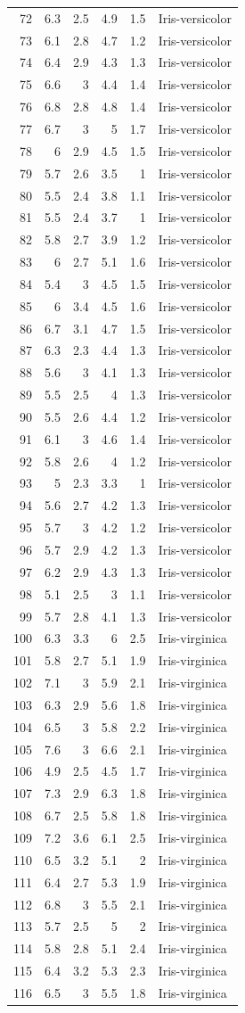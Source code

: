\documentclass [oneside,10pt,a4paper,ngerman,BCOR10mm,headsepline,parindent,final]{scrartcl}
\begin{document}
\begin{longtable}[]{@{}rrrrrl@{}}
72 & 6.3 & 2.5 & 4.9 & 1.5 & Iris-versicolor\tabularnewline
73 & 6.1 & 2.8 & 4.7 & 1.2 & Iris-versicolor\tabularnewline
74 & 6.4 & 2.9 & 4.3 & 1.3 & Iris-versicolor\tabularnewline
75 & 6.6 & 3 & 4.4 & 1.4 & Iris-versicolor\tabularnewline
76 & 6.8 & 2.8 & 4.8 & 1.4 & Iris-versicolor\tabularnewline
77 & 6.7 & 3 & 5 & 1.7 & Iris-versicolor\tabularnewline
78 & 6 & 2.9 & 4.5 & 1.5 & Iris-versicolor\tabularnewline
79 & 5.7 & 2.6 & 3.5 & 1 & Iris-versicolor\tabularnewline
80 & 5.5 & 2.4 & 3.8 & 1.1 & Iris-versicolor\tabularnewline
81 & 5.5 & 2.4 & 3.7 & 1 & Iris-versicolor\tabularnewline
82 & 5.8 & 2.7 & 3.9 & 1.2 & Iris-versicolor\tabularnewline
83 & 6 & 2.7 & 5.1 & 1.6 & Iris-versicolor\tabularnewline
84 & 5.4 & 3 & 4.5 & 1.5 & Iris-versicolor\tabularnewline
85 & 6 & 3.4 & 4.5 & 1.6 & Iris-versicolor\tabularnewline
86 & 6.7 & 3.1 & 4.7 & 1.5 & Iris-versicolor\tabularnewline
87 & 6.3 & 2.3 & 4.4 & 1.3 & Iris-versicolor\tabularnewline
88 & 5.6 & 3 & 4.1 & 1.3 & Iris-versicolor\tabularnewline
89 & 5.5 & 2.5 & 4 & 1.3 & Iris-versicolor\tabularnewline
90 & 5.5 & 2.6 & 4.4 & 1.2 & Iris-versicolor\tabularnewline
91 & 6.1 & 3 & 4.6 & 1.4 & Iris-versicolor\tabularnewline
92 & 5.8 & 2.6 & 4 & 1.2 & Iris-versicolor\tabularnewline
93 & 5 & 2.3 & 3.3 & 1 & Iris-versicolor\tabularnewline
94 & 5.6 & 2.7 & 4.2 & 1.3 & Iris-versicolor\tabularnewline
95 & 5.7 & 3 & 4.2 & 1.2 & Iris-versicolor\tabularnewline
96 & 5.7 & 2.9 & 4.2 & 1.3 & Iris-versicolor\tabularnewline
97 & 6.2 & 2.9 & 4.3 & 1.3 & Iris-versicolor\tabularnewline
98 & 5.1 & 2.5 & 3 & 1.1 & Iris-versicolor\tabularnewline
99 & 5.7 & 2.8 & 4.1 & 1.3 & Iris-versicolor\tabularnewline
100 & 6.3 & 3.3 & 6 & 2.5 & Iris-virginica\tabularnewline
101 & 5.8 & 2.7 & 5.1 & 1.9 & Iris-virginica\tabularnewline
102 & 7.1 & 3 & 5.9 & 2.1 & Iris-virginica\tabularnewline
103 & 6.3 & 2.9 & 5.6 & 1.8 & Iris-virginica\tabularnewline
104 & 6.5 & 3 & 5.8 & 2.2 & Iris-virginica\tabularnewline
105 & 7.6 & 3 & 6.6 & 2.1 & Iris-virginica\tabularnewline
106 & 4.9 & 2.5 & 4.5 & 1.7 & Iris-virginica\tabularnewline
107 & 7.3 & 2.9 & 6.3 & 1.8 & Iris-virginica\tabularnewline
108 & 6.7 & 2.5 & 5.8 & 1.8 & Iris-virginica\tabularnewline
109 & 7.2 & 3.6 & 6.1 & 2.5 & Iris-virginica\tabularnewline
110 & 6.5 & 3.2 & 5.1 & 2 & Iris-virginica\tabularnewline
111 & 6.4 & 2.7 & 5.3 & 1.9 & Iris-virginica\tabularnewline
112 & 6.8 & 3 & 5.5 & 2.1 & Iris-virginica\tabularnewline
113 & 5.7 & 2.5 & 5 & 2 & Iris-virginica\tabularnewline
114 & 5.8 & 2.8 & 5.1 & 2.4 & Iris-virginica\tabularnewline
115 & 6.4 & 3.2 & 5.3 & 2.3 & Iris-virginica\tabularnewline
116 & 6.5 & 3 & 5.5 & 1.8 & Iris-virginica\tabularnewline

\end{longtable}
\end{document}
